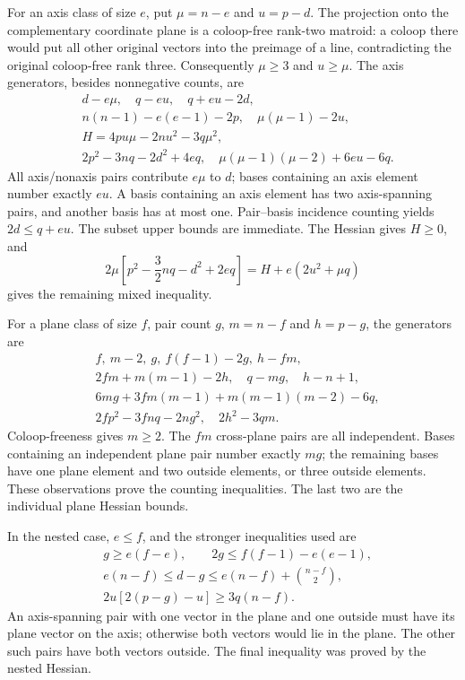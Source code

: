 \documentclass[11pt,a4paper]{article}
\theoremstyle{remark}\newtheorem{remark}[theorem]{Remark}
\begin{document}
For an axis class of size $e$, put $\mu=n-e$ and $u=p-d$. The projection onto the complementary coordinate plane is a coloop-free rank-two matroid: a coloop there would put all other original vectors into the preimage of a line, contradicting the original coloop-free rank three. Consequently $\mu\ge3$ and $u\ge\mu$. The axis generators, besides nonnegative counts, are
\begin{align*}
 &d-e\mu,\quad q-eu,\quad q+eu-2d,\\
 &n(n-1)-e(e-1)-2p,\quad \mu(\mu-1)-2u,\\
 &H=4pu\mu-2nu^2-3q\mu^2,\\
 &2p^2-3nq-2d^2+4eq,\quad
 \mu(\mu-1)(\mu-2)+6eu-6q.
\end{align*}
All axis/nonaxis pairs contribute $e\mu$ to $d$; bases containing an axis element number exactly $eu$. A basis containing an axis element has two axis-spanning pairs, and another basis has at most one. Pair--basis incidence counting yields $2d\le q+eu$. The subset upper bounds are immediate. The Hessian gives $H\ge0$, and
\[
 2\mu\left[p^2-\frac32nq-d^2+2eq\right]
       =H+e(2u^2+\mu q)
\]
gives the remaining mixed inequality.

For a plane class of size $f$, pair count $g$, $m=n-f$ and $h=p-g$, the generators are
\begin{align*}
 &f,\ m-2,\ g,\ f(f-1)-2g,\ h-fm,\\
 &2fm+m(m-1)-2h,\quad q-mg,\quad h-n+1,\\
 &6mg+3fm(m-1)+m(m-1)(m-2)-6q,\\
 &2fp^2-3fnq-2ng^2,\quad 2h^2-3qm.
\end{align*}
Coloop-freeness gives $m\ge2$. The $fm$ cross-plane pairs are all independent. Bases containing an independent plane pair number exactly $mg$; the remaining bases have one plane element and two outside elements, or three outside elements. These observations prove the counting inequalities. The last two are the individual plane Hessian bounds.

In the nested case, $e\le f$, and the stronger inequalities used are
\begin{align*}
 &g\ge e(f-e),\qquad 2g\le f(f-1)-e(e-1),\\
 &e(n-f)\le d-g\le e(n-f)+\binom{n-f}{2},\\
 &2u[2(p-g)-u]\ge3q(n-f).
\end{align*}
An axis-spanning pair with one vector in the plane and one outside must have its plane vector on the axis; otherwise both vectors would lie in the plane. The other such pairs have both vectors outside. The final inequality was proved by the nested Hessian.
\end{document}
